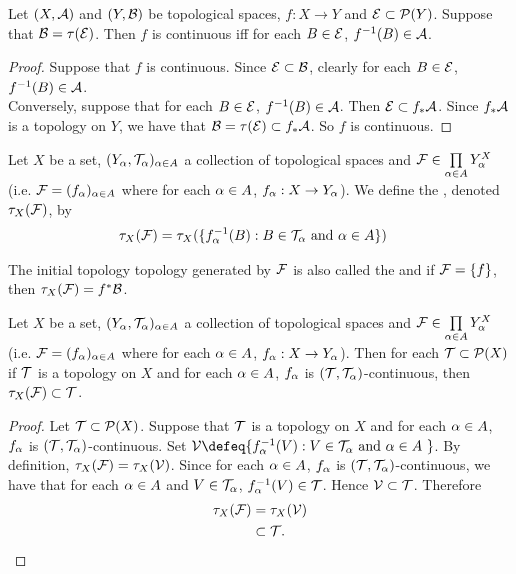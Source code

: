 \documentclass{book}
\begin{document}
	\begin{ex} 
	Let $(X,\mathcal{A})$ and $(Y,\mathcal{B})$ be topological spaces, $f:X \rightarrow Y$ and $\mathcal{E} \subset \mathcal{P}(Y)$. Suppose that $\mathcal{B} = \tau(\mathcal{E})$. Then $f$ is continuous iff for each $B \in \mathcal{E}$, $f^{-1}(B) \in \mathcal{A}$.
	\end{ex}
	
	\begin{proof}
	Suppose that $f$ is continuous. Since $\mathcal{E} \subset \mathcal{B}$, clearly for each $B \in \mathcal{E}$, $f^{-1}(B) \in \mathcal{A}$. \\
	Conversely, suppose that for each $B \in \mathcal{E}$, $f^{-1}(B) \in \mathcal{A}$. Then $\mathcal{E} \subset f_*\mathcal{A}$. Since $f_*\mathcal{A}$ is a topology on $Y$, we have that $\mathcal{B} = \tau(\mathcal{E}) \subset f_*\mathcal{A}$. So $f$ is continuous.
	\end{proof}
	
	\begin{defn} 
	Let $X$ be a set, $(Y_{\alpha}, \mathcal{T}_{\alpha})_{\alpha \in A}$ a collection of topological spaces and $\mathcal{F} \in \prod \limits_{\alpha \in A}Y_{\alpha}^X$ (i.e. $\mathcal{F} = (f_{\alpha})_{\alpha \in A}$ where for each $\alpha \in A$, $f_{\alpha}:X \rightarrow Y_{\alpha}$). We define the , denoted $\tau_X(\mathcal{F})$, by 
	\begin{align*}
	\tau_X(\mathcal{F}) 
	&= \tau_X(\{f_{\alpha}^{-1}(B): B \in \mathcal{T}_{\alpha} \text{ and } \alpha \in A \})
	\end{align*}	 
	\end{defn}

	\begin{note}
	The initial topology topology generated by $\mathcal{F}$ is also called the  and if $\mathcal{F} = \{f\}$, then $\tau_X(\mathcal{F}) = f^*\mathcal{B}$.
	\end{note}

	\begin{ex} 
		Let $X$ be a set, $(Y_{\alpha}, \mathcal{T}_{\alpha})_{\alpha \in A}$ a collection of topological spaces and $\mathcal{F} \in \prod \limits_{\alpha \in A}Y_{\alpha}^X$ (i.e. $\mathcal{F} = (f_{\alpha})_{\alpha \in A}$ where for each $\alpha \in A$, $f_{\alpha}:X \rightarrow Y_{\alpha}$). Then for each $\mathcal{T} \subset \mathcal{P}(X)$ if $\mathcal{T}$ is a topology on $X$ and for each $\alpha \in A$, $f_{\alpha}$ is $(\mathcal{T}, \mathcal{T}_{\alpha})$-continuous, then $\tau_X(\mathcal{F}) \subset \mathcal{T}$.
	\end{ex}
	
	\begin{proof}
		Let $\mathcal{T} \subset \mathcal{P}(X)$. Suppose that $\mathcal{T}$ is a topology on $X$ and for each $\alpha \in A$, $f_{\alpha}$ is $(\mathcal{T}, \mathcal{T}_{\alpha})$-continuous. Set $\MV \defeq \{f_{\al}^{-1}(V): \text{$V \in \MT_{\al}$ and $\al \in A$ }\}$. By definition, $\tau_X(\mathcal{F}) = \tau_X(\mathcal{V})$. Since for each $\alpha \in A$, $f_{\alpha}$ is $(\mathcal{T}, \mathcal{T}_{\alpha})$-continuous, we have that for each $\alpha \in A$ and $V \in \mathcal{T}_{\alpha}$, $f_{\alpha}^{-1}(V) \in \mathcal{T}$. Hence $\mathcal{V} \subset \mathcal{T}$. Therefore
		\begin{align*}
			\tau_X(\mathcal{F})
			& = \tau_X(\mathcal{V}) \\
			& \subset \mathcal{T}.
		\end{align*}
	\end{proof}
	
\end{document}
